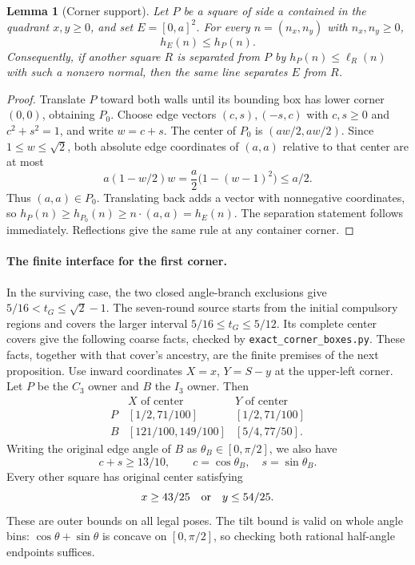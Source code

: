 \documentclass[11pt]{article}
\newtheorem{lemma}[theorem]{Lemma}
\begin{document}
\begin{lemma}[Corner support]\label{lem:corner-support}
Let $P$ be a square of side $a$ contained in the quadrant $x,y\ge0$,
and set $E=[0,a]^2$. For every $n=(n_x,n_y)$ with $n_x,n_y\ge0$,
\[
 h_E(n)\le h_P(n).
\]
Consequently, if another square $R$ is separated from $P$ by
$h_P(n)\le\ell_R(n)$ with such a nonzero normal, then the same line
separates $E$ from $R$.
\end{lemma}
\begin{proof}
Translate $P$ toward both walls until its bounding box has lower corner
$(0,0)$, obtaining $P_0$. Choose edge vectors $(c,s),(-s,c)$ with
$c,s\ge0$ and $c^2+s^2=1$, and write $w=c+s$.
The center of $P_0$ is $(aw/2,aw/2)$. Since $1\le w\le\sqrt2$,
both absolute edge coordinates of $(a,a)$ relative to that center are at
most
\[
 a(1-w/2)w=\frac a2\bigl(1-(w-1)^2\bigr)\le a/2.
\]
Thus $(a,a)\in P_0$. Translating back adds a vector with nonnegative
coordinates, so
$h_P(n)\ge h_{P_0}(n)\ge n\cdot(a,a)=h_E(n)$.
The separation statement follows immediately. Reflections give the same
rule at any container corner.
\end{proof}

\paragraph{The finite interface for the first corner.}
In the surviving case, the two closed angle-branch exclusions give
$5/16<t_G\le\sqrt2-1$. The seven-round source
 starts from the initial compulsory
regions and covers the larger interval $5/16\le t_G\le5/12$.
Its complete center covers give the following coarse facts, checked by
\texttt{exact\_corner\_boxes.py}. These facts, together with that cover's
ancestry, are the finite premises of the next proposition.
Use inward coordinates $X=x$, $Y=S-y$ at the upper-left corner.
Let $P$ be the $C_3$ owner and $B$ the $I_3$ owner. Then
\begin{equation}\label{eq:first-corner-envelope}
\begin{array}{c|cc}
 &X\text{ of center}&Y\text{ of center}\\ \hline
P &[1/2,71/100]&[1/2,71/100]\\
B &[121/100,149/100]&[5/4,77/50].
\end{array}
\end{equation}
Writing the original edge angle of $B$ as $\theta_B\in[0,\pi/2]$,
we also have
\begin{equation}\label{eq:first-corner-tilt}
 c+s\ge13/10,\qquad c=\cos\theta_B,\quad s=\sin\theta_B.
\end{equation}
Every other square has original center satisfying
\begin{equation}\label{eq:first-corner-exterior}
 x\ge43/25\quad\hbox{or}\quad y\le54/25.
\end{equation}
These are outer bounds on all legal poses. The tilt bound is valid on
whole angle bins: $\cos\theta+\sin\theta$ is concave on $[0,\pi/2]$,
so checking both rational half-angle endpoints suffices.
\end{document}
